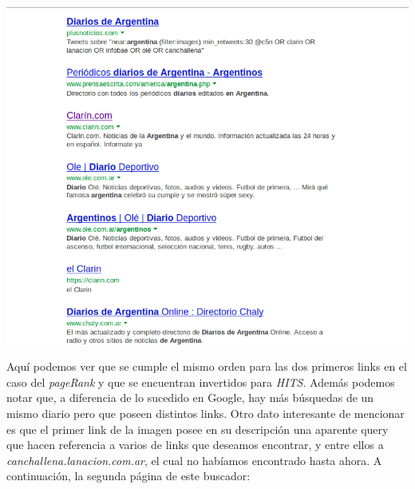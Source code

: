 	\par 
	\begin{center}
		\includegraphics[scale=0.5]{./img/primerapaginabing.png}
	\end{center}
	\par 
	
Aquí podemos ver que se cumple el mismo orden para las dos primeros links en el caso del \textit{pageRank} y que se encuentran invertidos para \textit{HITS}. Además podemos notar que, a diferencia de lo sucedido en Google, hay más búsquedas de un mismo diario pero que poseen distintos links. Otro dato interesante de mencionar es que el primer link de la imagen posee en su descripción una aparente query que hacen referencia a varios de links que deseamos encontrar, y entre ellos a \textit{canchallena.lanacion.com.ar}, el cual no habíamos encontrado hasta ahora.
A continuación, la segunda página de este buscador:

